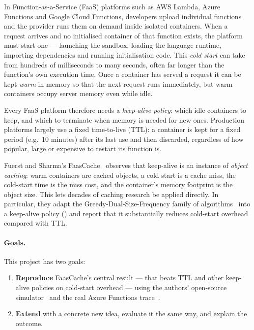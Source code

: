 \documentclass[11pt,a4paper]{article}
\newcommand{\gd}{\text{GD}}
\begin{document}
In Function-as-a-Service (FaaS) platforms such as AWS Lambda, Azure Functions and
Google Cloud Functions, developers upload individual functions and the provider runs
them on demand inside isolated containers. When a request arrives and no initialised
container of that function exists, the platform must start one --- launching the
sandbox, loading the language runtime, importing dependencies and running
initialisation code. This \emph{cold start} can take from hundreds of milliseconds to
many seconds, often far longer than the function's own execution time. Once a container
has served a request it can be kept \emph{warm} in memory so that the next request runs
immediately, but warm containers occupy server memory even while idle.

Every FaaS platform therefore needs a \emph{keep-alive policy}: which idle containers to
keep, and which to terminate when memory is needed for new ones. Production platforms
largely use a fixed time-to-live (TTL): a container is kept for a fixed period (e.g.\ 10
minutes) after its last use and then discarded, regardless of how popular, large or
expensive to restart its function is.

Fuerst and Sharma's FaasCache~\cite{fuerst2021faascache} observes that keep-alive is an
instance of \emph{object caching}: warm containers are cached objects, a cold start is a
cache miss, the cold-start time is the miss cost, and the container's memory footprint is
the object size. This lets decades of caching research be applied directly. In particular,
they adapt the Greedy-Dual-Size-Frequency family of algorithms~\cite{cao1997gds,cherkasova1998gdsf}
into a keep-alive policy (\gd{}) and report that it substantially reduces cold-start overhead
compared with TTL.

\paragraph{Goals.} This project has two goals:
\begin{enumerate}
  \item \textbf{Reproduce} FaasCache's central result --- that \gd{} beats TTL and other
        keep-alive policies on cold-start overhead --- using the authors' open-source
        simulator~\cite{faascachesim} and the real Azure Functions trace~\cite{azuredataset2019}.
  \item \textbf{Extend} \gd{} with a concrete new idea, evaluate it the same way, and
        explain the outcome.
\end{enumerate}
\end{document}
